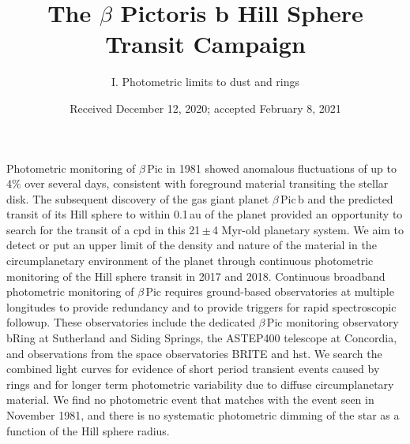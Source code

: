 \documentclass[longauth]{aa} %
\newcommand{\bpb}{$\beta$\,Pic\,b}
\newcommand{\bp}{$\beta$\,Pic}
\begin{document}
\title{The $\beta$ Pictoris b Hill Sphere Transit Campaign}
\subtitle{I. Photometric limits to dust and rings}




\date{Received December 12, 2020; accepted February 8, 2021}

  \abstract
  {}%
  {
    Photometric monitoring of \bp{} in 1981 showed anomalous fluctuations of up to 4\% over several days, consistent with foreground material transiting the stellar disk.
    The subsequent discovery of the gas giant planet \bpb{} and the predicted transit of its Hill sphere to within 0.1\,au of the planet provided an opportunity to search for the transit of a \ac{cpd} in this 21\,$\pm$\,4 Myr-old planetary system. 
We aim to detect or put an upper limit of the density and nature of the material in the circumplanetary environment of the planet through continuous photometric monitoring of the Hill sphere transit in 2017 and 2018.
  }
   {Continuous broadband photometric monitoring of \bp{} requires ground-based observatories at multiple longitudes to provide redundancy and to provide triggers for rapid spectroscopic followup. 
   These observatories include the dedicated \bp{} monitoring observatory bRing at Sutherland and Siding Springs, the ASTEP400 telescope at Concordia, and observations 
   from the space observatories BRITE and \ac{hst}.
   We search the combined light curves for evidence of short period transient events caused by rings and for longer term photometric variability due to diffuse circumplanetary material.}
   {We find no photometric event that matches with the event seen in November 1981, and there is no systematic photometric dimming of the star as a function of the Hill sphere radius.}
\end{document}
